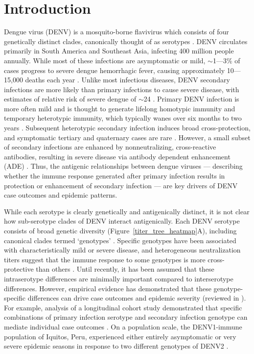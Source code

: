 \documentclass[11pt,oneside,letterpaper]{article}
\begin{document}
\section*{Introduction}
Dengue virus (DENV) is a mosquito-borne flavivirus which consists of four genetically distinct clades, canonically thought of as serotypes \citep{lanciotti1997molecular}.
DENV circulates primarily in South America and Southeast Asia, infecting 400 million people annually.
While most of these infections are asymptomatic or mild, $\sim$1---3\% of cases progress to severe dengue hemorrhagic fever, causing approximately 10---15,000 deaths each year \citep{bhatt2013global}.
Unlike most infectious diseases, DENV secondary infections are more likely than primary infections to cause severe disease, with estimates of relative risk of severe dengue of $\sim$24 \citep{mizumoto2014risk}.
Primary DENV infection is more often mild and is thought to generate lifelong homotypic immunity and temporary heterotypic immunity, which typically wanes over six months to two years \citep{katzelnick2016neutralizing,sabin1952research}.
Subsequent heterotypic secondary infection induces broad cross-protection, and symptomatic tertiary and quaternary cases are rare  \citep{gibbons2007analysis,olkowski2013reduced}.
However, a small subset of secondary infections are enhanced by nonneutralizing, cross-reactive antibodies, resulting in severe disease via antibody dependent enhancement (ADE) \citep{halstead1979vivo,katzelnick2017antibody,sangkawibha1984risk}.
Thus, the antigenic relationships between dengue viruses --- describing whether the immune response generated after primary infection results in protection or enhancement of secondary infection --- are key drivers of DENV case outcomes and epidemic patterns.

While each serotype is clearly genetically and antigenically distinct, it is not clear how sub-serotype clades of DENV interact antigenically.
Each DENV serotype consists of broad genetic diversity (Figure~\ref{titer_tree_heatmap}A), including canonical clades termed `genotypes'  \citep{rico1990molecular,twiddy2003inferring}.
Specific genotypes have been associated with characteristically mild or severe disease, and heterogeneous neutralization titers suggest that the immune response to some genotypes is more cross-protective than others \citep{gentry1982identification,russell1967dengue}.
Until recently, it has been assumed that these intraserotype differences are minimally important compared to interserotype differences.
However, empirical evidence has demonstrated that these genotype-specific differences can drive case outcomes and epidemic severity (reviewed in \citep{holmes2003origin}).
For example, analysis of a longitudinal cohort study demonstrated that specific combinations of primary infection serotype and secondary infection genotype can mediate individual case outcomes \citep{ohainle2011dynamics}.
On a population scale, the DENV1-immune population of Iquitos, Peru, experienced either entirely asymptomatic or very severe epidemic seasons in response to two different genotypes of DENV2 \citep{kochel2002effect}.
\end{document}
